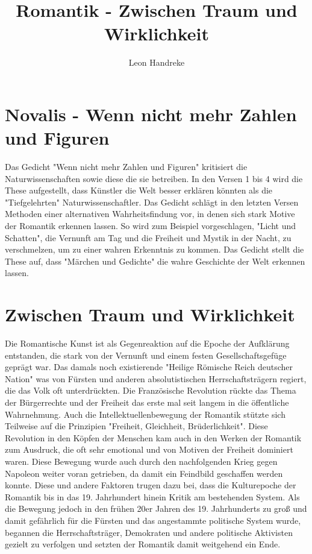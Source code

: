 \documentclass[11pt]{article}
\title{Romantik - Zwischen Traum und Wirklichkeit}
\author{Leon Handreke}
\date{}                                           %
\begin{document}
\maketitle

\selectfont

\doublespacing

\section{Novalis - Wenn nicht mehr Zahlen und Figuren}

Das Gedicht "Wenn nicht mehr Zahlen und Figuren" kritisiert die Naturwissenschaften sowie diese die sie betreiben. In den Versen 1 bis 4 wird die These aufgestellt, dass Künstler die Welt besser erklären könnten als die "Tiefgelehrten" Naturwissenschaftler. Das Gedicht schlägt in den letzten Versen Methoden einer alternativen Wahrheitsfindung vor, in denen sich stark Motive der Romantik erkennen lassen. So wird zum Beispiel vorgeschlagen, "Licht und Schatten", die Vernunft am Tag und die Freiheit und Mystik in der Nacht, zu verschmelzen, um zu einer wahren Erkenntnis zu kommen. Das Gedicht stellt die These auf, dass "Märchen und Gedichte" die wahre Geschichte der Welt erkennen lassen.

\section{Zwischen Traum und Wirklichkeit}

Die Romantische Kunst ist als Gegenreaktion auf die Epoche der Aufklärung entstanden, die stark von der Vernunft und einem festen Gesellschaftsgefüge geprägt war. Das damals noch existierende "Heilige Römische Reich deutscher Nation" was von Fürsten und anderen absolutistischen Herrschaftsträgern regiert, die das Volk oft unterdrückten. Die Französische Revolution rückte das Thema der Bürgerrechte und der Freiheit das erste mal seit langem in die öffentliche Wahrnehmung. Auch die Intellektuellenbewegung der Romantik stützte sich Teilweise auf die Prinzipien "Freiheit, Gleichheit, Brüderlichkeit". Diese Revolution in den Köpfen der Menschen kam auch in den Werken der Romantik zum Ausdruck, die oft sehr emotional und von Motiven der Freiheit dominiert waren. Diese Bewegung wurde auch durch den nachfolgenden Krieg gegen Napoleon weiter voran getrieben, da damit ein Feindbild geschaffen werden konnte. Diese und andere Faktoren trugen dazu bei, dass die Kulturepoche der Romantik bis in das 19. Jahrhundert hinein Kritik am bestehenden System. Als die Bewegung jedoch in den frühen 20er Jahren des 19. Jahrhunderts zu groß und damit gefährlich für die Fürsten und das angestammte politische System wurde, begannen die Herrschaftsträger, Demokraten und andere politische Aktivisten gezielt zu verfolgen und setzten der Romantik damit weitgehend ein Ende.
\end{document}
